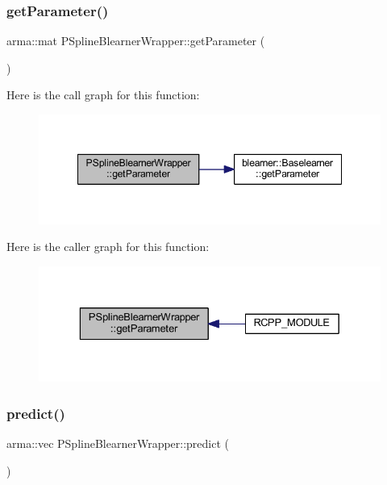 \subsubsection{\texorpdfstring{get\+Parameter()}{getParameter()}}
{\footnotesize\ttfamily arma\+::mat P\+Spline\+Blearner\+Wrapper\+::get\+Parameter (\begin{DoxyParamCaption}{ }\end{DoxyParamCaption})\hspace{0.3cm}{\ttfamily [inline]}}

Here is the call graph for this function\+:\nopagebreak
\begin{figure}[H]
\begin{center}
\leavevmode
\includegraphics[width=348pt]{class_p_spline_blearner_wrapper_a2d9c9e319c4638c85a4d419918929f9b_cgraph}
\end{center}
\end{figure}
Here is the caller graph for this function\+:\nopagebreak
\begin{figure}[H]
\begin{center}
\leavevmode
\includegraphics[width=329pt]{class_p_spline_blearner_wrapper_a2d9c9e319c4638c85a4d419918929f9b_icgraph}
\end{center}
\end{figure}
\mbox{\label{class_p_spline_blearner_wrapper_a43a442f80348b28fc40d8e4773678511}} 
\subsubsection{\texorpdfstring{predict()}{predict()}}
{\footnotesize\ttfamily arma\+::vec P\+Spline\+Blearner\+Wrapper\+::predict (\begin{DoxyParamCaption}{ }\end{DoxyParamCaption})\hspace{0.3cm}{\ttfamily [inline]}}

